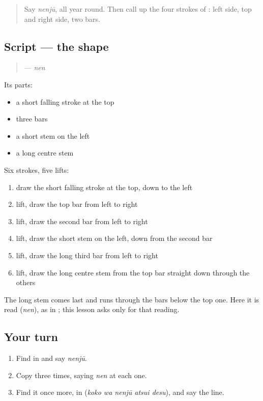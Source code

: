 \begin{quote}
Say \emph{nenjū}, all year round. Then call up the four strokes of \textbf{}: left side, top and right side, two bars.
\end{quote}

\subsection*{Script — the shape}
\begin{quote}
\textbf{} — \emph{nen}
\end{quote}

Its parts:

\begin{itemize}
\raggedright
  \item a short falling stroke at the top
  \item three bars
  \item a short stem on the left
  \item a long centre stem
\end{itemize}

Six strokes, five lifts:

\begin{enumerate}
\raggedright
  \item draw the short falling stroke at the top, down to the left
  \item lift, draw the top bar from left to right
  \item lift, draw the second bar from left to right
  \item lift, draw the short stem on the left, down from the second bar
  \item lift, draw the long third bar from left to right
  \item lift, draw the long centre stem from the top bar straight down through the others
\end{enumerate}

The long stem comes last and runs through the bars below the top one. Here it is read \textbf{} (\emph{nen}), as in \textbf{}; this lesson asks only for that reading.

\subsection*{Your turn}
\begin{enumerate}
\raggedright
  \item Find \textbf{} in \textbf{} and say \emph{nenjū}.
  \item Copy \textbf{} three times, saying \emph{nen} at each one.
  \item Find it once more, in \textbf{  } (\emph{koko wa nenjū atsui desu}), and say the line.
\end{enumerate}

